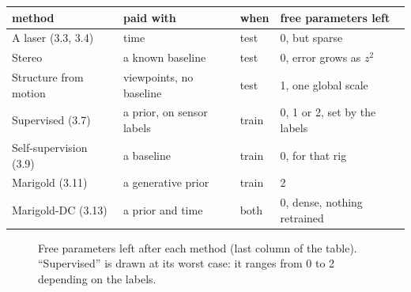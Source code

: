 \documentclass[11pt,a4paper]{article}
\theoremstyle{plain}
\theoremstyle{definition}
\numberwithin{equation}{section}
\begin{document}
\begin{center}\small
\begin{tabular}{@{}p{3.4cm}p{3.6cm}l p{4.2cm}@{}}\toprule
method & paid with & when & free parameters left\\\midrule
A laser (3.3, 3.4) & time & test & 0, but sparse\\
Stereo & a known baseline & test & 0, error grows as $z^2$\\
Structure from motion & viewpoints, no baseline & test & 1, one global scale\\
Supervised (3.7) & a prior, on sensor labels & train & 0, 1 or 2, set by the labels\\
Self-supervision (3.9) & a baseline & train & 0, for that rig\\
Marigold (3.11) & a generative prior & train & 2\\
Marigold-DC (3.13) & a prior and time & both & 0, dense, nothing retrained\\\bottomrule
\end{tabular}
\end{center}

\begin{figure}[H]
\centering
{}
\caption{Free parameters left after each method (last column of the table). ``Supervised'' is drawn at its worst case: it ranges from 0 to 2 depending on the labels.}
\end{figure}
\end{document}
